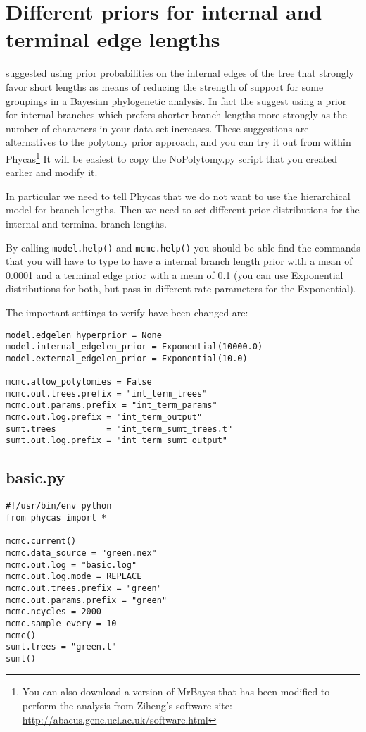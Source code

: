 \documentclass{article}
\newcommand{\cmd}[1]{\texttt{#1}\xspace}
\newcommand{\mb}{MrBayes\xspace}
\newcommand{\phycas}{Phycas\xspace}
\newcommand{\localfile}[1]{\textsf{#1}\xspace}
\begin{document}
\section{Different priors for internal and terminal edge lengths}
\citet{YangR2005} \citep[and][]{Yang2007} suggested using prior probabilities on the internal edges of the tree
that strongly favor short lengths as means of reducing the strength
of support for some groupings in a Bayesian phylogenetic analysis.
In fact the suggest using a prior for internal branches which prefers shorter branch lengths more
strongly as the number of characters in your data set increases.
These suggestions are alternatives to the polytomy prior approach, and you can try it out from within 
\phycas\footnote{You can also download a version of \mb that has been modified to perform the analysis from Ziheng's software site: \url{http://abacus.gene.ucl.ac.uk/software.html}}
It will be easiest to copy the \localfile{NoPolytomy.py} script that you created earlier 
and modify it.

In particular we need to tell \phycas that we do not want to use the hierarchical model for
branch lengths.
Then we need to set different prior distributions for the internal and terminal branch lengths.

By calling \cmd{model.help()} and \cmd{mcmc.help()} you should be able find the commands that you will have to type to have a internal branch length prior with a mean of 0.0001 and a terminal edge prior with a mean of 0.1 (you can use Exponential distributions for both, but pass in different rate parameters for the Exponential).

The important settings to verify have been changed are:
\begin{verbatim}
model.edgelen_hyperprior = None
model.internal_edgelen_prior = Exponential(10000.0)
model.external_edgelen_prior = Exponential(10.0)

mcmc.allow_polytomies = False
mcmc.out.trees.prefix = "int_term_trees"
mcmc.out.params.prefix = "int_term_params"
mcmc.out.log.prefix = "int_term_output"
sumt.trees          = "int_term_sumt_trees.t"
sumt.out.log.prefix = "int_term_sumt_output"
\end{verbatim}


\newpage
\subsection{basic.py}\label{basicpy}
\begin{verbatim}
#!/usr/bin/env python
from phycas import *

mcmc.current()
mcmc.data_source = "green.nex"
mcmc.out.log = "basic.log"
mcmc.out.log.mode = REPLACE
mcmc.out.trees.prefix = "green"
mcmc.out.params.prefix = "green"
mcmc.ncycles = 2000
mcmc.sample_every = 10
mcmc()
sumt.trees = "green.t"
sumt()
\end{verbatim}
\end{document}
